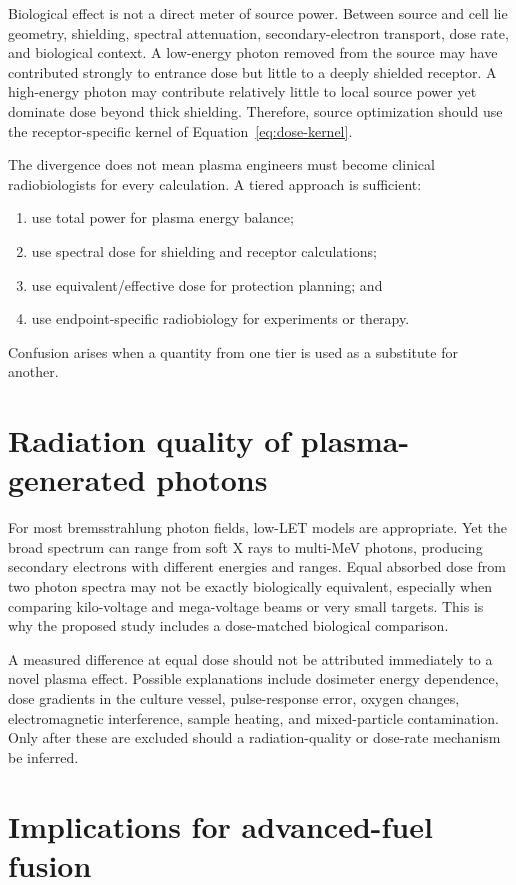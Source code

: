 Biological effect is not a direct meter of source power. Between source and cell lie geometry, shielding, spectral attenuation, secondary-electron transport, dose rate, and biological context. A low-energy photon removed from the source may have contributed strongly to entrance dose but little to a deeply shielded receptor. A high-energy photon may contribute relatively little to local source power yet dominate dose beyond thick shielding. Therefore, source optimization should use the receptor-specific kernel of Equation~\eqref{eq:dose-kernel}.

The divergence does not mean plasma engineers must become clinical radiobiologists for every calculation. A tiered approach is sufficient:
\begin{enumerate}
\item use total power for plasma energy balance;
\item use spectral dose for shielding and receptor calculations;
\item use equivalent/effective dose for protection planning; and
\item use endpoint-specific radiobiology for experiments or therapy.
\end{enumerate}
Confusion arises when a quantity from one tier is used as a substitute for another.

\section{Radiation quality of plasma-generated photons}

For most bremsstrahlung photon fields, low-LET models are appropriate. Yet the broad spectrum can range from soft X rays to multi-MeV photons, producing secondary electrons with different energies and ranges. Equal absorbed dose from two photon spectra may not be exactly biologically equivalent, especially when comparing kilo-voltage and mega-voltage beams or very small targets. This is why the proposed study includes a dose-matched biological comparison.

A measured difference at equal dose should not be attributed immediately to a novel plasma effect. Possible explanations include dosimeter energy dependence, dose gradients in the culture vessel, pulse-response error, oxygen changes, electromagnetic interference, sample heating, and mixed-particle contamination. Only after these are excluded should a radiation-quality or dose-rate mechanism be inferred.

\section{Implications for advanced-fuel fusion}

